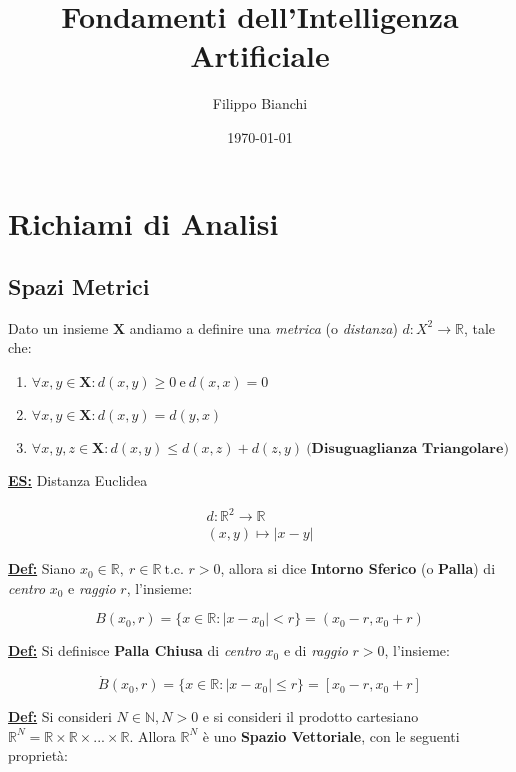 \documentclass[a4paper,12pt]{article}
\title{Fondamenti dell'Intelligenza Artificiale}
\author{Filippo Bianchi}
\date{\today}
\newcommand{\definizione}{\noindent\textbf{\underline{Def:}} }
\begin{document}
	\maketitle

	\tableofcontents

	\newpage

	\section{Richiami di Analisi}

	\subsection{Spazi Metrici}

	Dato un insieme $\textbf{X}$ andiamo a definire una \textit{metrica} (o \textit{distanza}) $d: X^2 \rightarrow \mathbb{R}$, tale che:

	\begin{enumerate}
		\item $\forall x,y \in \textbf{X} : d(x,y) \geq 0 \ \text{e} \ d(x,x) = 0$
		\item $\forall x,y \in \textbf{X} : d(x,y) = d(y,x)$
		\item $\forall x,y,z \in \textbf{X} : d(x,y) \leq d(x,z) + d(z,y) \ \textbf{(Disuguaglianza Triangolare)}$
	\end{enumerate}

	\noindent \textbf{\underline{ES:}} Distanza Euclidea

	\[
	\begin{array}{c}
		d : \mathbb{R}^2 \rightarrow \mathbb{R} \\
		(x, y) \mapsto |x - y|
	\end{array}
	\]

	\noindent \textbf{\underline{Def:}} Siano $x_0 \in \mathbb{R}, \ r \in \mathbb{R} \ \text{t.c. } r > 0$, allora si dice \textbf{Intorno Sferico} (o \textbf{Palla}) di \textit{centro} $x_0$ e \textit{raggio} $r$, l'insieme:

	\[
	B(x_0,r) = \{x \in \mathbb{R} : |x - x_0| < r\} = (x_0 - r, x_0 + r)
	\]

	\definizione Si definisce \textbf{Palla Chiusa} di \textit{centro} $x_0$ e di \textit{raggio} $r > 0$, l'insieme:

	\[
	\dot{B} (x_0,r) = \{ x \in \mathbb{R} : |x -x_0| \leq r \} = [x_0 - r, x_0 + r]
	\]

	\definizione Si consideri $ N \in \mathbb{N}, N > 0$ e si consideri il prodotto cartesiano $\mathbb{R}^N = \mathbb{R} \times \mathbb{R} \times ... \times \mathbb{R}$. Allora $\mathbb{R}^N$ è uno \textbf{Spazio Vettoriale}, con le seguenti proprietà:
\end{document}
